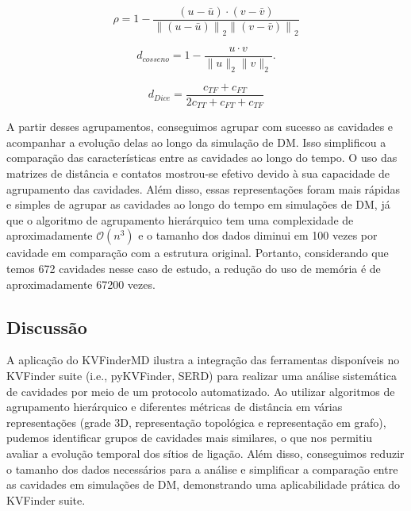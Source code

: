 \documentclass[Portugues]{phdquali}
\def\ie{i.e.\onedot}
\begin{document}
\begin{equation}
  \rho = 1 - \frac{(u - \bar{u}) \cdot (v - \bar{v})}{{\|(u - \bar{u})\|}_2 {\|(v - \bar{v})\|}_2}
  \label{eq:correlacao}
\end{equation}

\begin{equation}
  d_{cosseno} = 1 - \frac{u \cdot v}{\|u\|_2 \|v\|_2}.
  \label{eq:cosseno}
\end{equation}

\begin{equation}
  d_{Dice} = \frac{c_{TF} + c_{FT}}{2c_{TT} + c_{FT} + c_{TF}}
 \label{eq:dice}
\end{equation}

A partir desses agrupamentos, conseguimos agrupar com sucesso as cavidades e acompanhar a evolução delas ao longo da simulação de DM. Isso simplificou a comparação das características entre as cavidades ao longo do tempo. O uso das matrizes de distância e contatos mostrou-se efetivo devido à sua capacidade de agrupamento das cavidades. Além disso, essas representações foram mais rápidas e simples de agrupar as cavidades ao longo do tempo em simulações de DM, já que o algoritmo de agrupamento hierárquico tem uma complexidade de aproximadamente $\mathcal{O}(n^3)$ e o tamanho dos dados diminui em 100 vezes por cavidade em comparação com a estrutura original. Portanto, considerando que temos 672 cavidades nesse caso de estudo, a redução do uso de memória é de aproximadamente 67200 vezes.

\subsection{Discussão}

A aplicação do KVFinderMD ilustra a integração das ferramentas disponíveis no KVFinder suite (\ie, pyKVFinder, SERD) para realizar uma análise sistemática de cavidades por meio de um protocolo automatizado. Ao utilizar algoritmos de agrupamento hierárquico e diferentes métricas de distância em várias representações (grade 3D, representação topológica e representação em grafo), pudemos identificar grupos de cavidades mais similares, o que nos permitiu avaliar a evolução temporal dos sítios de ligação. Além disso, conseguimos reduzir o tamanho dos dados necessários para a análise e simplificar a comparação entre as cavidades em simulações de DM, demonstrando uma aplicabilidade prática do KVFinder suite.
\end{document}
